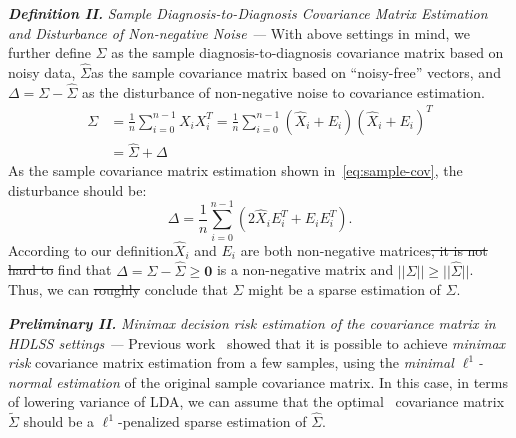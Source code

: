 \documentclass[journal,compsoc]{IEEEtran}
\providecommand{\DIFadd}[1]{{\protect\color{blue}\uwave{#1}}} %
\providecommand{\DIFdel}[1]{{\protect\color{red}\sout{#1}}}                      %
\providecommand{\DIFaddbegin}{} %
\providecommand{\DIFaddend}{} %
\providecommand{\DIFdelbegin}{} %
\providecommand{\DIFdelend}{} %
\begin{document}
\textbf{\em Definition II.} \emph{Sample Diagnosis-to-Diagnosis Covariance Matrix Estimation and Disturbance of Non-negative Noise --- } With \DIFaddbegin \DIFadd{the }\DIFaddend above settings in mind, we further define $\Sigma$ as the sample diagnosis-to-diagnosis covariance matrix based on noisy data, $\hat{\Sigma}$\DIFaddbegin \DIFadd{, }\DIFaddend as the sample covariance matrix based on ``noisy-free'' vectors, and  $\Delta=\Sigma-\hat{\Sigma}$ as the disturbance of non-negative noise to covariance estimation.
%
\begin{equation}
\begin{aligned}
\Sigma&=\frac{1}{n}\sum_{i=0}^{n-1} X_iX_i^T
=\frac{1}{n}\sum_{i=0}^{n-1} (\hat{X}_i+E_i)(\hat{X}_i+E_i)^T\\
&=\hat{\Sigma}+\Delta
\end{aligned}
\label{eq:sample-cov}
\end{equation}
As the sample covariance matrix estimation shown in~\ref{eq:sample-cov}, the disturbance should be:
%
$$\Delta=\frac{1}{n}\sum_{i=0}^{n-1}(2\hat{X}_iE_i^T+E_iE_i^T).$$ 
%
According to our definition\DIFaddbegin \DIFadd{, }\DIFaddend $\hat{X}_i$ and $E_i$ are both non-negative matrices\DIFdelbegin \DIFdel{, it is not hard to }\DIFdelend \DIFaddbegin \DIFadd{. 
From this, we }\DIFaddend find that $\Delta=\Sigma-\hat{\Sigma}\geq \textbf{0}$ is a non-negative matrix and $||\Sigma||\geq ||\hat{\Sigma}||$. 
Thus, we can \DIFdelbegin \DIFdel{roughly }\DIFdelend conclude that $\hat{\Sigma}$ might be a sparse estimation of $\Sigma$. 

\textbf{\em Preliminary II. } \emph{Minimax decision risk estimation of the covariance matrix in HDLSS settings --- } Previous work~\cite{cai2012minimax,xue2012positive} showed that it is possible to achieve \emph{minimax risk} covariance matrix estimation from a few samples, using the \emph{minimal $\ell^1$-normal estimation} of the original sample covariance matrix. 
In this case, in terms of lowering variance of LDA, we can assume that the optimal~\cite{cai2012minimax} covariance matrix $\tilde{\Sigma}$ should be a $\ell^1$-penalized sparse estimation of $\hat{\Sigma}$.
\end{document}

